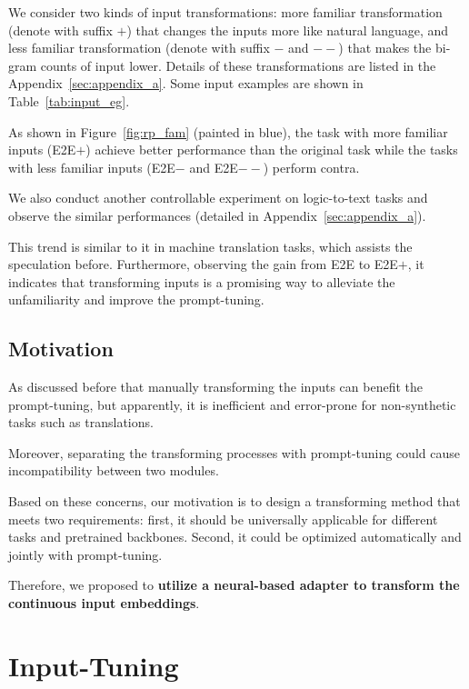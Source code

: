 We consider two kinds of input transformations: more familiar transformation (denote with suffix $\mathbf{+}$) that changes the inputs more like natural language, and less familiar transformation  (denote with suffix $\mathbf{-}$ and $\mathbf{--}$) that makes the bi-gram counts of input lower. Details of these transformations are listed in the Appendix~\ref{sec:appendix_a}.
Some input examples are shown in Table~\ref{tab:input_eg}.

As shown in Figure~\ref{fig:rp_fam} (painted in \textcolor[rgb]{0,0,0.9}{blue}), the task with more familiar inputs (E2E$\mathbf{+}$) achieve better performance than the original task while the tasks with less familiar inputs (E2E$\mathbf{-}$ and E2E$\mathbf{--}$) perform contra.

We also conduct another controllable experiment on logic-to-text tasks and observe the similar performances (detailed in Appendix~\ref{sec:appendix_a}).

This trend is similar to it in machine translation tasks, which assists the speculation before. Furthermore, observing the gain from E2E to E2E$\mathbf{+}$, it indicates that transforming inputs is a promising way to alleviate the unfamiliarity and improve the prompt-tuning.

\subsection{Motivation}
\label{section:motivation}
As discussed before that manually transforming the inputs can benefit the prompt-tuning, but apparently, it is inefficient and error-prone for non-synthetic tasks such as translations.

Moreover, separating the transforming processes with prompt-tuning could cause incompatibility between two modules.

Based on these concerns, our motivation is to design a transforming method that meets two requirements: first, it should be universally applicable for different tasks and pretrained backbones. Second, it could be optimized automatically and jointly with prompt-tuning.

Therefore, we proposed to \textbf{utilize a neural-based adapter to transform the continuous input embeddings}.

\section{Input-Tuning}\label{sec:method}


